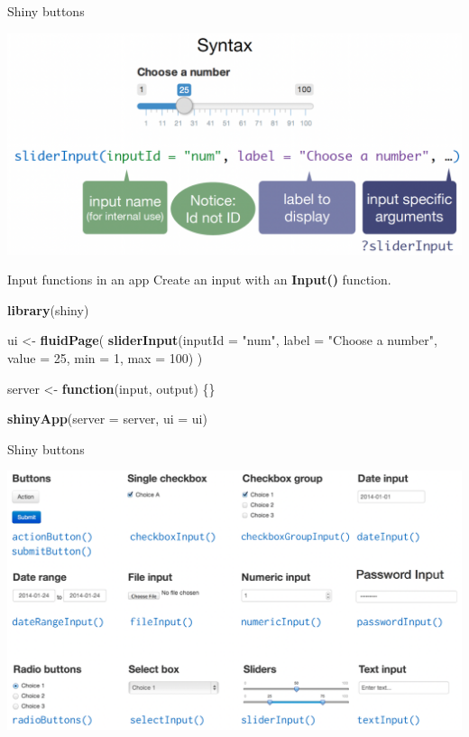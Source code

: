 \documentclass[
  ignorenonframetext,
]{beamer}
\newenvironment{Shaded}{\begin{snugshade}}{\end{snugshade}}
\newcommand{\AttributeTok}[1]{\textcolor[rgb]{0.13,0.29,0.53}{#1}}
\newcommand{\ControlFlowTok}[1]{\textcolor[rgb]{0.13,0.29,0.53}{\textbf{#1}}}
\newcommand{\DecValTok}[1]{\textcolor[rgb]{0.00,0.00,0.81}{#1}}
\newcommand{\FunctionTok}[1]{\textcolor[rgb]{0.13,0.29,0.53}{\textbf{#1}}}
\newcommand{\NormalTok}[1]{#1}
\newcommand{\OtherTok}[1]{\textcolor[rgb]{0.56,0.35,0.01}{#1}}
\newcommand{\StringTok}[1]{\textcolor[rgb]{0.31,0.60,0.02}{#1}}
\begin{document}
\begin{frame}{Shiny buttons}
\label{shiny-buttons}
\center

\includegraphics{shinyfigs/shiny_buttons_syntax.png}
\end{frame}

\begin{frame}[fragile]{Input functions in an app}
\label{input-functions-in-an-app}
Create an input with an \textbf{Input()} function.

\begin{Shaded}
\begin{Highlighting}[]
\FunctionTok{library}\NormalTok{(shiny)}

\NormalTok{ui }\OtherTok{\textless{}{-}} \FunctionTok{fluidPage}\NormalTok{(}
  \FunctionTok{sliderInput}\NormalTok{(}\AttributeTok{inputId =} \StringTok{"num"}\NormalTok{,}
    \AttributeTok{label =} \StringTok{"Choose a number"}\NormalTok{,}
    \AttributeTok{value =} \DecValTok{25}\NormalTok{, }\AttributeTok{min =} \DecValTok{1}\NormalTok{, }\AttributeTok{max =} \DecValTok{100}\NormalTok{)}
\NormalTok{  )}

\NormalTok{server }\OtherTok{\textless{}{-}} \ControlFlowTok{function}\NormalTok{(input, output) \{\}}

\FunctionTok{shinyApp}\NormalTok{(}\AttributeTok{server =}\NormalTok{ server, }\AttributeTok{ui =}\NormalTok{ ui)}
\end{Highlighting}
\end{Shaded}
\end{frame}

\begin{frame}{Shiny buttons}
\label{shiny-buttons-1}
\center

\includegraphics{shinyfigs/shiny_buttons.png}
\end{frame}
\end{document}
